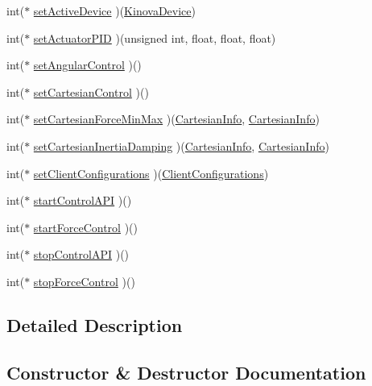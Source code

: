 \begin{DoxyCompactItemize}
\item 
int($\ast$ \hyperlink{classjaco_1_1JacoAPI_a4e0c8fc007f20e985545b59abf571ea0}{set\+Active\+Device} )(\hyperlink{Kinova_8API_8CommLayerUbuntu_8h_da/dd6/structKinovaDevice}{Kinova\+Device})
\item 
int($\ast$ \hyperlink{classjaco_1_1JacoAPI_a3fff8abf62a8b45c1905bad4c5592126}{set\+Actuator\+P\+ID} )(unsigned int, float, float, float)
\item 
int($\ast$ \hyperlink{classjaco_1_1JacoAPI_a4ce9340d50866cf102722ad6c370bdfd}{set\+Angular\+Control} )()
\item 
int($\ast$ \hyperlink{classjaco_1_1JacoAPI_a24b6c14f08d97bea2a5562c8c2f10877}{set\+Cartesian\+Control} )()
\item 
int($\ast$ \hyperlink{classjaco_1_1JacoAPI_aa592360dc8cc3d2a2343621d8ec8dac5}{set\+Cartesian\+Force\+Min\+Max} )(\hyperlink{structCartesianInfo}{Cartesian\+Info}, \hyperlink{structCartesianInfo}{Cartesian\+Info})
\item 
int($\ast$ \hyperlink{classjaco_1_1JacoAPI_a24709f5e768c7aab4a9b1de1308d65ea}{set\+Cartesian\+Inertia\+Damping} )(\hyperlink{structCartesianInfo}{Cartesian\+Info}, \hyperlink{structCartesianInfo}{Cartesian\+Info})
\item 
int($\ast$ \hyperlink{classjaco_1_1JacoAPI_ad6b85298e2502e6888ce6b7a1e494e49}{set\+Client\+Configurations} )(\hyperlink{KinovaTypes_8h_d1/d2e/structClientConfigurations}{Client\+Configurations})
\item 
int($\ast$ \hyperlink{classjaco_1_1JacoAPI_a75d269278bf284a368f42ce1f8a3eb2e}{start\+Control\+A\+PI} )()
\item 
int($\ast$ \hyperlink{classjaco_1_1JacoAPI_a548f1d6251582bb4fe9cb5cb69f08b2d}{start\+Force\+Control} )()
\item 
int($\ast$ \hyperlink{classjaco_1_1JacoAPI_a41fefb13b76fc591cde461d1a9b91bb2}{stop\+Control\+A\+PI} )()
\item 
int($\ast$ \hyperlink{classjaco_1_1JacoAPI_ac3881ef354400b32a4d71796dba66d67}{stop\+Force\+Control} )()
\end{DoxyCompactItemize}


\subsection{Detailed Description}


\subsection{Constructor \& Destructor Documentation}
